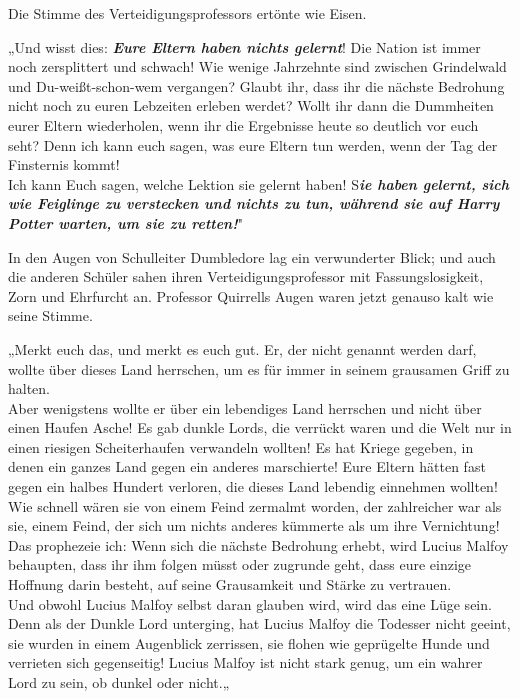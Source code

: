 {Die Stimme des Verteidigungsprofessors ertönte wie Eisen.

„Und wisst dies: \textbf{\emph{Eure Eltern haben nichts gelernt}}! Die Nation ist immer noch zersplittert und schwach! Wie wenige Jahrzehnte sind zwischen Grindelwald und Du-weißt-schon-wem vergangen? Glaubt ihr, dass ihr die nächste Bedrohung nicht noch zu euren Lebzeiten erleben werdet? Wollt ihr dann die Dummheiten eurer Eltern wiederholen, wenn ihr die Ergebnisse heute so deutlich vor euch seht? Denn ich kann euch sagen, was eure Eltern tun werden, wenn der Tag der Finsternis kommt!\\ Ich kann Euch sagen, welche Lektion sie gelernt haben! S\textbf{\emph{ie haben gelernt, sich wie Feiglinge zu verstecken und nichts zu tun, während sie auf Harry Potter warten, um sie zu retten!}}"

In den Augen von Schulleiter Dumbledore lag ein verwunderter Blick; und auch die anderen Schüler sahen ihren Verteidigungsprofessor mit Fassungslosigkeit, Zorn und Ehrfurcht an. Professor Quirrells Augen waren jetzt genauso kalt wie seine Stimme.

„Merkt euch das, und merkt es euch gut. Er, der nicht genannt werden darf, wollte über dieses Land herrschen, um es für immer in seinem grausamen Griff zu halten.\\ Aber wenigstens wollte er über ein lebendiges Land herrschen und nicht über einen Haufen Asche! Es gab dunkle Lords, die verrückt waren und die Welt nur in einen riesigen Scheiterhaufen verwandeln wollten! Es hat Kriege gegeben, in denen ein ganzes Land gegen ein anderes marschierte! Eure Eltern hätten fast gegen ein halbes Hundert verloren, die dieses Land lebendig einnehmen wollten!\\ Wie schnell wären sie von einem Feind zermalmt worden, der zahlreicher war als sie, einem Feind, der sich um nichts anderes kümmerte als um ihre Vernichtung!\\ Das prophezeie ich: Wenn sich die nächste Bedrohung erhebt, wird Lucius Malfoy behaupten, dass ihr ihm folgen müsst oder zugrunde geht, dass eure einzige Hoffnung darin besteht, auf seine Grausamkeit und Stärke zu vertrauen.\\ Und obwohl Lucius Malfoy selbst daran glauben wird, wird das eine Lüge sein. Denn als der Dunkle Lord unterging, hat Lucius Malfoy die Todesser nicht geeint, sie wurden in einem Augenblick zerrissen, sie flohen wie geprügelte Hunde und verrieten sich gegenseitig! Lucius Malfoy ist nicht stark genug, um ein wahrer Lord zu sein, ob dunkel oder nicht.„

}

